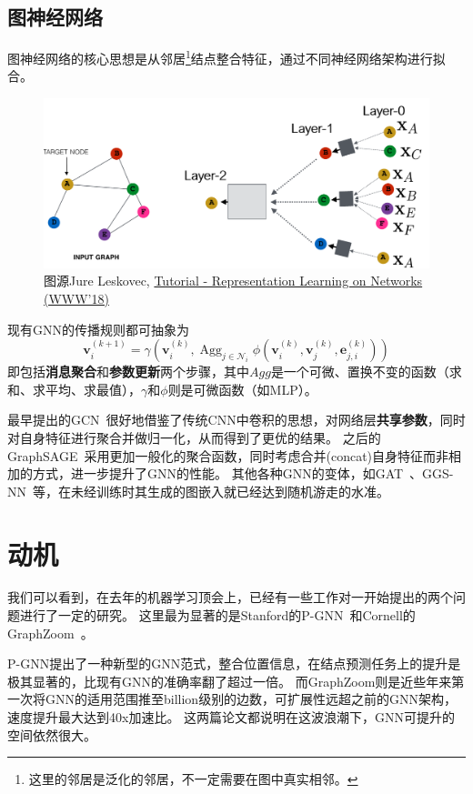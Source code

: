 \documentclass[reportComp]{thesis}
\begin{document}
\subsection{图神经网络}
图神经网络的核心思想是从邻居\footnote{这里的邻居是泛化的邻居，不一定需要在图中真实相邻。}结点整合特征，通过不同神经网络架构进行拟合。
\begin{figure}[H]
\centering
\includegraphics[width=0.8\linewidth]{fig/grl-layers.png}
\caption{图源Jure Leskovec, \href{http://snap.stanford.edu/proj/embeddings-www/}{Tutorial - Representation Learning on Networks (WWW'18)}}
\end{figure}

现有GNN的传播规则都可抽象为\cite{fey:pytorch_geo_2019}
\[\mathbf{v}_i^{(k+1)}=\gamma\left(\mathbf{v}_i^{(k)},\mathop{Agg}_{j\in\mathcal{N}_i}\phi(\mathbf{v}_i^{(k)},\mathbf{v}_j^{(k)},\mathbf{e}_{j,i}^{(k)})\right)\]
即包括\textbf{消息聚合}和\textbf{参数更新}两个步骤，其中$Agg$是一个可微、置换不变的函数（求和、求平均、求最值），$\gamma$和$\phi$则是可微函数（如MLP）。

最早提出的GCN~\cite{kipf:gcn_iclr_2017}很好地借鉴了传统CNN中卷积的思想，对网络层\textbf{共享参数}，同时对自身特征进行聚合并做归一化，从而得到了更优的结果。
之后的GraphSAGE~\cite{hamilton:graphsage_neurips_2017}采用更加一般化的聚合函数，同时考虑合并(concat)自身特征而非相加的方式，进一步提升了GNN的性能。
其他各种GNN的变体，如GAT~\cite{velickovic:gat_iclr_2018}、GGS-NN~\cite{li:ggsnn_iclr_2016}等，在未经训练时其生成的图嵌入就已经达到随机游走的水准。

\section{动机}
我们可以看到，在去年的机器学习顶会上，已经有一些工作对一开始提出的两个问题进行了一定的研究。
这里最为显著的是Stanford的P-GNN~\cite{you:pgnn_icml_2019}和Cornell的GraphZoom~\cite{deng:graphzoom_iclr_2019}。

P-GNN提出了一种新型的GNN范式，整合位置信息，在结点预测任务上的提升是极其显著的，比现有GNN的准确率翻了超过一倍。
而GraphZoom则是近些年来第一次将GNN的适用范围推至billion级别的边数，可扩展性远超之前的GNN架构，速度提升最大达到40x加速比。
这两篇论文都说明在这波浪潮下，GNN可提升的空间依然很大。
\end{document}
